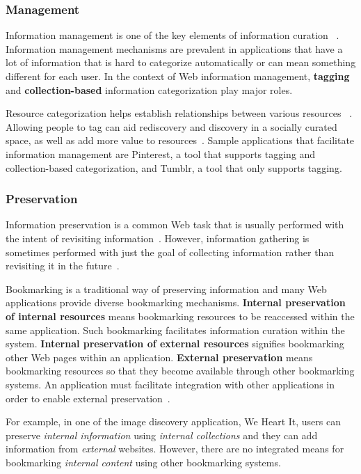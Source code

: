 {{{\subsubsection{Management}
Information management is one of the key elements of information curation ~\cite{beagrie2008digital,whittaker2011personal}. Information management mechanisms are prevalent in applications that have a lot of information that is hard to categorize automatically or can mean something different for each user. In the context of Web information management, \textbf{tagging} and \textbf{collection-based} information categorization play major roles.

Resource categorization helps establish relationships between various resources ~\cite{beagrie2008digital,whittaker2011personal}. Allowing people to tag can aid rediscovery and discovery in a socially curated space, as well as add more value to resources~\cite{gruber2007ontology}. Sample applications that facilitate information management are Pinterest, a tool that supports tagging and collection-based categorization, and Tumblr, a tool that only supports tagging.
} %

{\subsubsection{Preservation}
Information preservation is a common Web task that is usually performed with the intent of revisiting information~\cite{abrams1998information,whittaker2011personal}. However, information gathering is sometimes performed with just the goal of collecting information rather than revisiting it in the future~\cite{lindley2012s}. 

Bookmarking is a traditional way of preserving information and many Web applications provide diverse bookmarking mechanisms. \textbf{Internal preservation of internal resources} means bookmarking resources to be reaccessed within the same application. Such bookmarking facilitates information curation within the system. \textbf{Internal preservation of external resources} signifies bookmarking other Web pages within an application. \textbf{External preservation} means bookmarking resources so that they become available through other bookmarking systems. An application must facilitate integration with other applications in order to enable external preservation~\cite{abrams1998information}.

For example, in one of the image discovery application, We Heart It, users can preserve \textit{internal  information} using \textit{internal collections} and they can add information from \textit{external} websites. However, there are no integrated means for bookmarking \textit{internal content} using other bookmarking systems.  
} %

}}
